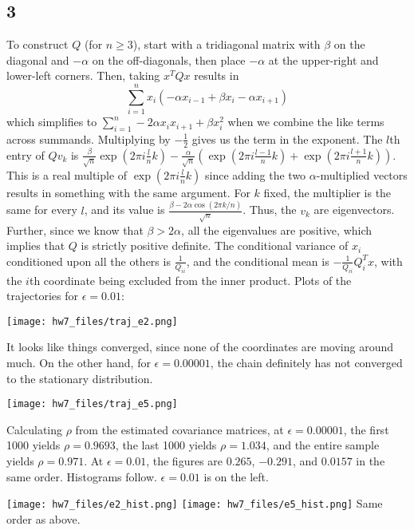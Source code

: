\documentclass{article}
\newcommand{\ep}{\epsilon}
\begin{document}
\subsection*{3}
\vspace{130pt}
To construct $Q$ (for $n\geq3$), start with a tridiagonal matrix with $\beta$ on the diagonal and $-\alpha$ on the off-diagonals, then place $-\alpha$ at the upper-right and lower-left corners. Then, taking $x^TQx$ results in 
\[\sum_{i=1}^nx_i(-\alpha x_{i-1}+\beta x_i-\alpha x_{i+1})\]
which simplifies to $\sum_{i=1}^n-2\alpha x_ix_{i+1}+\beta x_i^2$ when we combine the like terms across summands. Multiplying by $-\frac{1}{2}$ gives us the term in the exponent.
The $l$th entry of $Qv_k$ is $\frac{\beta}{\sqrt{n}}\exp(2\pi i\frac{l}{n}k)-\frac{\alpha}{\sqrt{n}}\left(\exp(2\pi i\frac{l-1}{n}k)+\exp(2\pi i\frac{l+1}{n}k)\right)$. This is a real multiple of $\exp(2\pi i\frac{l}{n}k)$ since adding the two $\alpha$-multiplied vectors results in something with the same argument. For $k$ fixed, the multiplier is the same for every $l$, and its value is $\frac{\beta-2\alpha\cos(2\pi k/n)}{\sqrt{n}}$. Thus, the $v_k$ are eigenvectors. Further, since we know that $\beta>2\alpha$, all the eigenvalues are positive, which implies that $Q$ is strictly positive definite.
The conditional variance of $x_i$ conditioned upon all the others is $\frac{1}{Q_{ii}}$, and the conditional mean is $-\frac{1}{Q_{ii}}Q_i^Tx$, with the $i$th coordinate being excluded from the inner product.
Plots of the trajectories for $\ep=0.01$:

\texttt{[image: hw7\_files/traj\_e2.png]}

It looks like things converged, since none of the coordinates are moving around much. On the other hand, for $\ep=0.00001$, the chain definitely has not converged to the stationary distribution.

\texttt{[image: hw7\_files/traj\_e5.png]}

Calculating $\rho$ from the estimated covariance matrices, at $\ep=0.00001$, the first 1000 yields $\rho=0.9693$, the last 1000 yields $\rho=1.034$, and the entire sample yields $\rho=0.971$. At $\ep=0.01$, the figures are $0.265$, $-0.291$, and $0.0157$ in the same order.
Histograms follow. $\ep=0.01$ is on the left.

\texttt{[image: hw7\_files/e2\_hist.png]}
\texttt{[image: hw7\_files/e5\_hist.png]}
Same order as above.
\end{document}
